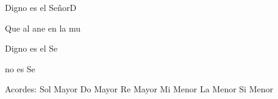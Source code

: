 \documentclass[12pt, spanish]{book}
\begin{document}
\begin{song}{Digno es el Señor}{D}
\begin{SBExtraKeys}
{\begin{SBChorus}
                Que al ane en la  mu

                Digno es el Se

                no es  Se
            \end{SBChorus}


            \ifChordBk
            \begin{SBOpGroup}
                Acordes:\break
                \upchord{\G}\qquad Sol Mayor \hfill
                \upchord{\C}\qquad Do Mayor \hfill\null\break
                \upchord{\D}\qquad Re Mayor \hfill
                \upchord{\Em}\qquad Mi Menor \hfill\null\break
                \upchord{\Am}\qquad La Menor \hfill
                \upchord{\Bm}\qquad Si Menor \hfill\null\break
            \end{SBOpGroup}
            \fi
        }\end{SBExtraKeys}
    \end{song}
\end{document}
